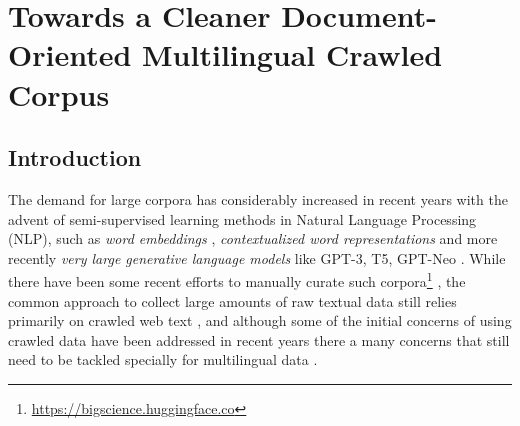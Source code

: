 \chapter{Towards a Cleaner Document-Oriented Multilingual Crawled Corpus}

\section{Introduction}

The demand for large corpora has considerably increased in recent years with the advent of semi-supervised learning methods in Natural Language Processing (NLP), such as \emph{word embeddings} \cite{mikolov-etal-2013-distributed,pennington-etal-2014-glove,mikolov-etal-2018-advances}, \emph{contextualized word representations} \cite{howard-ruder-2018-universal,peters-etal-2018-deep,devlin-etal-2019-bert} and more recently \emph{very large generative language models} like GPT-3, T5, GPT-Neo \cite{raffel-etal-2020-exploring,brown-etal-2020-language,black-etal-2021-gpt}. While there have been some recent efforts to manually curate such corpora\footnote{\url{https://bigscience.huggingface.co}} \cite{gao-etal-2020-pile}, the common approach to collect large amounts of raw textual data still relies primarily on crawled web text \cite{ortiz-suarez-etal-2019-asynchronous,ortiz-suarez-etal-2020-monolingual,xue-etal-2021-mt5,el-kishky-etal-2020-ccaligned,espla-etal-2019-paracrawl,banon-etal-2020-paracrawl,gao-etal-2020-pile}, and although some of the initial concerns of using crawled data \cite{trinh-le-2018-a,radford-etal-2019-language} have been addressed in recent years \cite{ortiz-suarez-etal-2020-monolingual,martin-etal-2020-camembert} there a many concerns that still need to be tackled \cite{caswell-etal-2020-language} specially for multilingual data \cite{caswell-etal-2021-quality}.

